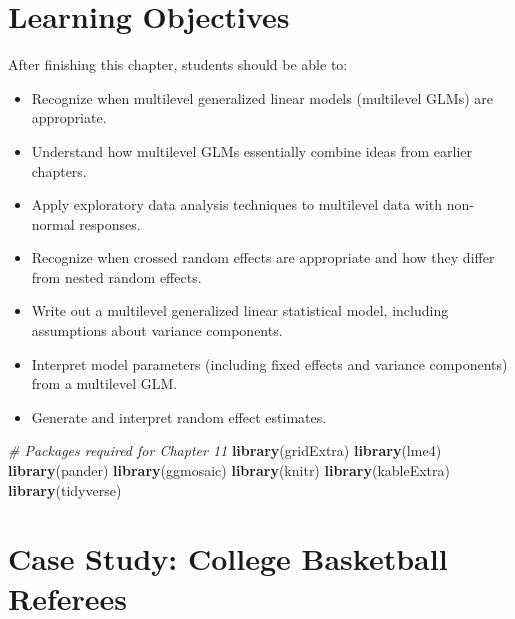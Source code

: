 \documentclass[
]{krantz}
\newenvironment{Shaded}{\begin{snugshade}}{\end{snugshade}}
\newcommand{\CommentTok}[1]{\textcolor[rgb]{0.37,0.37,0.37}{\textit{#1}}}
\newcommand{\KeywordTok}[1]{\textcolor[rgb]{0.27,0.27,0.27}{\textbf{#1}}}
\newcommand{\NormalTok}[1]{#1}
\providecommand{\tightlist}{%
  \setlength{\itemsep}{0pt}\setlength{\parskip}{0pt}}
\begin{document}
\hypertarget{objectives}{%
\section{Learning Objectives}\label{objectives}}

After finishing this chapter, students should be able to:

\begin{itemize}
\tightlist
\item
  Recognize when multilevel generalized linear models (multilevel GLMs) are appropriate.
\item
  Understand how multilevel GLMs essentially combine ideas from earlier chapters.
\item
  Apply exploratory data analysis techniques to multilevel data with non-normal responses.
\item
  Recognize when crossed random effects are appropriate and how they differ from nested random effects.
\item
  Write out a multilevel generalized linear statistical model, including assumptions about variance components.
\item
  Interpret model parameters (including fixed effects and variance components) from a multilevel GLM.
\item
  Generate and interpret random effect estimates.
\end{itemize}

\begin{Shaded}
\begin{Highlighting}[]
\CommentTok{# Packages required for Chapter 11}
\KeywordTok{library}\NormalTok{(gridExtra)}
\KeywordTok{library}\NormalTok{(lme4)}
\KeywordTok{library}\NormalTok{(pander)}
\KeywordTok{library}\NormalTok{(ggmosaic)}
\KeywordTok{library}\NormalTok{(knitr)}
\KeywordTok{library}\NormalTok{(kableExtra)}
\KeywordTok{library}\NormalTok{(tidyverse)}
\end{Highlighting}
\end{Shaded}

\hypertarget{cs:refs}{%
\section{Case Study: College Basketball Referees}\label{cs:refs}}
\end{document}
